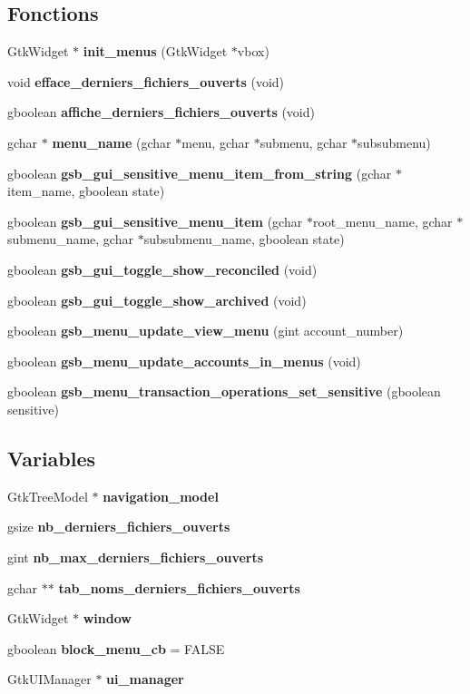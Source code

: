 \subsection*{Fonctions}
\begin{DoxyCompactItemize}
\item 
GtkWidget $\ast$ {\bf init\_\-menus} (GtkWidget $\ast$vbox)
\item 
void {\bf efface\_\-derniers\_\-fichiers\_\-ouverts} (void)
\item 
gboolean {\bf affiche\_\-derniers\_\-fichiers\_\-ouverts} (void)
\item 
gchar $\ast$ {\bf menu\_\-name} (gchar $\ast$menu, gchar $\ast$submenu, gchar $\ast$subsubmenu)
\item 
gboolean {\bf gsb\_\-gui\_\-sensitive\_\-menu\_\-item\_\-from\_\-string} (gchar $\ast$item\_\-name, gboolean state)
\item 
gboolean {\bf gsb\_\-gui\_\-sensitive\_\-menu\_\-item} (gchar $\ast$root\_\-menu\_\-name, gchar $\ast$submenu\_\-name, gchar $\ast$subsubmenu\_\-name, gboolean state)
\item 
gboolean {\bf gsb\_\-gui\_\-toggle\_\-show\_\-reconciled} (void)
\item 
gboolean {\bf gsb\_\-gui\_\-toggle\_\-show\_\-archived} (void)
\item 
gboolean {\bf gsb\_\-menu\_\-update\_\-view\_\-menu} (gint account\_\-number)
\item 
gboolean {\bf gsb\_\-menu\_\-update\_\-accounts\_\-in\_\-menus} (void)
\item 
gboolean {\bf gsb\_\-menu\_\-transaction\_\-operations\_\-set\_\-sensitive} (gboolean sensitive)
\end{DoxyCompactItemize}
\subsection*{Variables}
\begin{DoxyCompactItemize}
\item 
GtkTreeModel $\ast$ {\bf navigation\_\-model}
\item 
gsize {\bf nb\_\-derniers\_\-fichiers\_\-ouverts}
\item 
gint {\bf nb\_\-max\_\-derniers\_\-fichiers\_\-ouverts}
\item 
gchar $\ast$$\ast$ {\bf tab\_\-noms\_\-derniers\_\-fichiers\_\-ouverts}
\item 
GtkWidget $\ast$ {\bf window}
\item 
gboolean {\bf block\_\-menu\_\-cb} = FALSE
\item 
GtkUIManager $\ast$ {\bf ui\_\-manager}
\end{DoxyCompactItemize}


